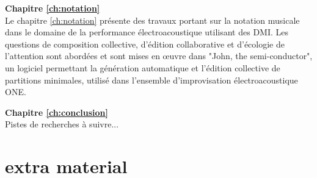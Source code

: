\textbf{Chapitre \ref{ch:notation}} \\[0.2em]
Le chapitre \ref{ch:notation} présente des travaux portant sur la notation musicale dans le domaine de la performance électroacoustique utilisant des DMI. Les questions de composition collective, d'édition collaborative et d'écologie de l'attention sont abordées et sont mises en œuvre dans "John, the semi-conductor", un logiciel permettant la génération automatique et l'édition collective de partitions minimales, utilisé dans l'ensemble d'improvisation électroacoustique ONE. 

\textbf{Chapitre \ref{ch:conclusion}} \\[0.2em]
Pistes de recherches à suivre...


\section*{extra material}
